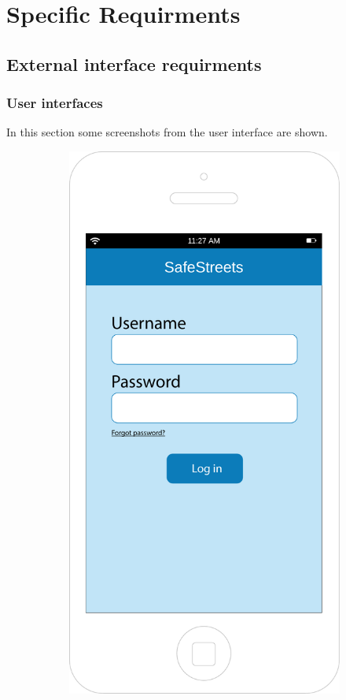 \documentclass[12pt,a4paper]{report}
\begin{document}

\chapter{Specific Requirments}
	\section{External interface requirments}
		\subsection{User interfaces}
		In this section some screenshots from the user interface are shown.
		\begin{figure}[H]
		\begin{subfigure}{0.5\textwidth}
			\includegraphics[scale=0.25, center]{Login}

\end{subfigure}
\end{figure}
\end{document}
